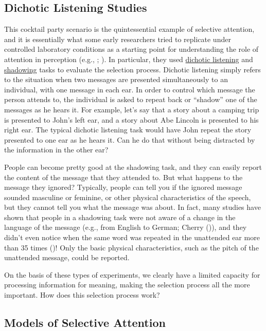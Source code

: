 \documentclass[
]{krantz}
\begin{document}
\subsection*{Dichotic Listening Studies}\label{dichotic-listening-studies}


This cocktail party scenario is the quintessential example of selective attention, and it is essentially what some early researchers tried to replicate under controlled laboratory conditions as a starting point for understanding the role of attention in perception (e.g., ; ). In particular, they used \hyperref[dichotic-listening]{dichotic listening} and \hyperref[shadowing]{shadowing} tasks to evaluate the selection process. Dichotic listening simply refers to the situation when two messages are presented simultaneously to an individual, with one message in each ear. In order to control which message the person attends to, the individual is asked to repeat back or ``shadow'' one of the messages as he hears it. For example, let's say that a story about a camping trip is presented to John's left ear, and a story about Abe Lincoln is presented to his right ear. The typical dichotic listening task would have John repeat the story presented to one ear as he hears it. Can he do that without being distracted by the information in the other ear?

People can become pretty good at the shadowing task, and they can easily report the content of the message that they attended to. But what happens to the message they ignored? Typically, people can tell you if the ignored message sounded masculine or feminine, or other physical characteristics of the speech, but they cannot tell you what the message was about. In fact, many studies have shown that people in a shadowing task were not aware of a change in the language of the message (e.g., from English to German; Cherry ()), and they didn't even notice when the same word was repeated in the unattended ear more than 35 times ()! Only the basic physical characteristics, such as the pitch of the unattended message, could be reported.

On the basis of these types of experiments, we clearly have a limited capacity for processing information for meaning, making the selection process all the more important. How does this selection process work?

\subsection*{Models of Selective Attention}\label{models-of-selective-attention}
\end{document}
